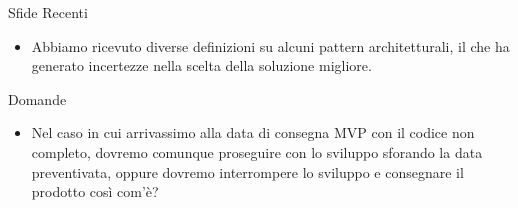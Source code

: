 \documentclass{beamer}
\begin{document}
\begin{frame}
    \begin{alertblock}{Sfide Recenti}
        \begin{itemize}
            \item Abbiamo ricevuto diverse definizioni su alcuni pattern architetturali, il che ha generato incertezze nella scelta della soluzione migliore.
        \end{itemize}
    \end{alertblock}
\end{frame}

\begin{frame}
    \begin{exampleblock}{Domande}
        \begin{itemize}
            \item Nel caso in cui arrivassimo alla data di consegna MVP con il codice non completo, dovremo comunque proseguire con lo sviluppo sforando la data preventivata, oppure dovremo interrompere lo sviluppo e consegnare il prodotto così com'è?
        \end{itemize}
    \end{exampleblock}
\end{frame}
\end{document}
